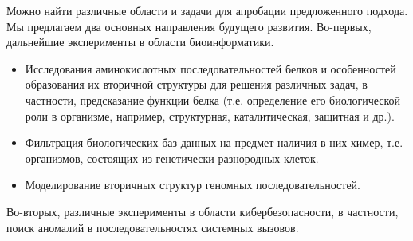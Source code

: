 \documentclass[14pt]{matmex-diploma-custom}
\begin{document}
Можно найти различные области и задачи для апробации предложенного подхода. Мы предлагаем два основных направления будущего развития. Во-первых, дальнейшие эксперименты в области биоинформатики.
\begin{itemize}
    \item Исследования аминокислотных последовательностей белков и особенностей образования их вторичной структуры для решения различных задач, в частности, предсказание функции белка (т.е. определение его биологической роли в организме, например, структурная, каталитическая, защитная и др.).
    \item Фильтрация биологических баз данных на предмет наличия в них химер, т.е. организмов, состоящих из генетически разнородных клеток.
    \item Моделирование вторичных структур геномных последовательностей.
\end{itemize}
 Во-вторых, различные эксперименты в области кибербезопасности, в частности, поиск аномалий в последовательностях системных вызовов.



\setmonofont[Mapping=tex-text]{CMU Typewriter Text}

\renewcommand\refname{Список литературы}

\end{document}
